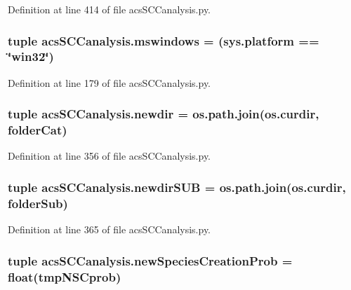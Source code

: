 Definition at line 414 of file acs\-S\-C\-Canalysis.\-py.

\hypertarget{a00102_a2abf09620dd1dd990036c67c626b3dee}{
\subsubsection[{mswindows}]{\setlength{\rightskip}{0pt plus 5cm}tuple acs\-S\-C\-Canalysis.\-mswindows = (sys.\-platform == \char`\"{}win32\char`\"{})}}\label{a00102_a2abf09620dd1dd990036c67c626b3dee}


Definition at line 179 of file acs\-S\-C\-Canalysis.\-py.

\hypertarget{a00102_a440179ca1c764cabcf9181985ae5dfb8}{
\subsubsection[{newdir}]{\setlength{\rightskip}{0pt plus 5cm}tuple acs\-S\-C\-Canalysis.\-newdir = os.\-path.\-join(os.\-curdir, {\bf folder\-Cat})}}\label{a00102_a440179ca1c764cabcf9181985ae5dfb8}


Definition at line 356 of file acs\-S\-C\-Canalysis.\-py.

\hypertarget{a00102_adb3b62d0896774bc87adfee19d047aa8}{
\subsubsection[{newdir\-S\-U\-B}]{\setlength{\rightskip}{0pt plus 5cm}tuple acs\-S\-C\-Canalysis.\-newdir\-S\-U\-B = os.\-path.\-join(os.\-curdir, {\bf folder\-Sub})}}\label{a00102_adb3b62d0896774bc87adfee19d047aa8}


Definition at line 365 of file acs\-S\-C\-Canalysis.\-py.

\hypertarget{a00102_a47b24df6e487f6dd90158dde93cc7c93}{
\subsubsection[{new\-Species\-Creation\-Prob}]{\setlength{\rightskip}{0pt plus 5cm}tuple acs\-S\-C\-Canalysis.\-new\-Species\-Creation\-Prob = float(tmp\-N\-S\-Cprob)}}\label{a00102_a47b24df6e487f6dd90158dde93cc7c93}


